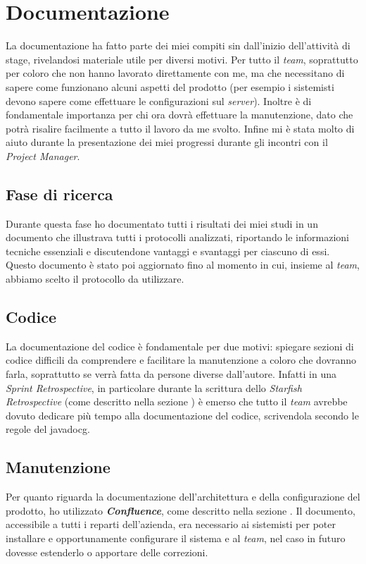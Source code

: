 \section{Documentazione}
La documentazione ha fatto parte dei miei compiti sin dall'inizio dell'attività di stage, rivelandosi materiale utile per diversi motivi. Per tutto il \textit{team}, soprattutto per coloro che non hanno lavorato direttamente con me, ma che necessitano di sapere come funzionano alcuni aspetti del prodotto (per esempio i sistemisti devono sapere come effettuare le configurazioni sul \textit{server}). Inoltre è di fondamentale importanza per chi ora dovrà effettuare la manutenzione, dato che potrà risalire facilmente a tutto il lavoro da me svolto. Infine mi è stata molto di aiuto durante la presentazione dei miei progressi durante gli incontri con il \textit{Project Manager}.
\subsection{Fase di ricerca}
Durante questa fase ho documentato tutti i risultati dei miei studi in un documento  che illustrava tutti i protocolli analizzati, riportando le informazioni tecniche essenziali e discutendone vantaggi e svantaggi per ciascuno di essi. Questo documento è stato poi aggiornato fino al momento in cui, insieme al \textit{team}, abbiamo scelto il protocollo da utilizzare.
\subsection{Codice}
La documentazione del codice è fondamentale per due motivi: spiegare sezioni di codice difficili da comprendere e facilitare la manutenzione a coloro che dovranno farla, soprattutto se verrà fatta da persone diverse dall'autore. Infatti in una \textit{Sprint Retrospective}, in particolare durante la scrittura dello \textit{Starfish Retrospective} (come descritto nella sezione ) è emerso che tutto il \textit{team} avrebbe dovuto dedicare più tempo alla documentazione del codice, scrivendola secondo le regole del \gls{javadocg}.
\subsection{Manutenzione}
Per quanto riguarda la documentazione dell'architettura e della configurazione del prodotto, ho utilizzato \textbf{\textit{Confluence}}, come descritto nella sezione . Il documento, accessibile a tutti i reparti dell'azienda, era necessario ai sistemisti per poter installare e opportunamente configurare il sistema e al \textit{team}, nel caso in futuro dovesse estenderlo o apportare delle correzioni.


